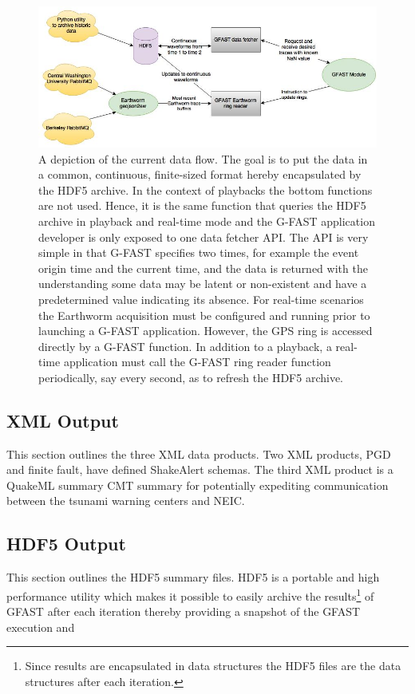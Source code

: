 \documentclass[12pt]{article}
\begin{document}
\begin{center}
\begin{figure}
\includegraphics[scale=0.55]{Figs/gfast_dataIO.jpg}
\caption{A depiction of the current data flow.  The goal is to put the data in a common, 
continuous, finite-sized format hereby encapsulated by the HDF5 archive.  
In the context of playbacks the bottom functions are not used.
Hence, it is the same function that queries the HDF5 archive in playback and 
real-time mode and the G-FAST application developer is only exposed to one data 
fetcher API.  The API is very simple in that G-FAST specifies two times, for example 
the event origin time and the current time, and the data is returned with the understanding
some data may be latent or non-existent and have a predetermined value indicating its absence. 
For real-time scenarios the Earthworm acquisition must be configured 
and running prior to launching a G-FAST application.  However, the GPS ring is 
accessed directly by a G-FAST function.  In addition to a playback, a real-time application 
must call the G-FAST ring reader function periodically, say every second, as to refresh the 
HDF5 archive.
}\label{F:gfastDataIO}
\end{figure}
\end{center}

\clearpage
\subsection{XML Output}
This section outlines the three XML data products.  Two XML products, PGD and finite fault, have
defined ShakeAlert schemas.  The third XML product is a QuakeML summary CMT summary for potentially
expediting communication between the tsunami warning centers and NEIC. 

\clearpage
\subsection{HDF5 Output}
This section outlines the HDF5 summary files.  HDF5 is a portable and high performance 
utility which makes it possible to easily archive the results\footnote{Since results are 
encapsulated in data structures the HDF5 files are the data structures after each iteration.}
of GFAST after each iteration thereby providing a snapshot of the GFAST execution and 
\end{document}
